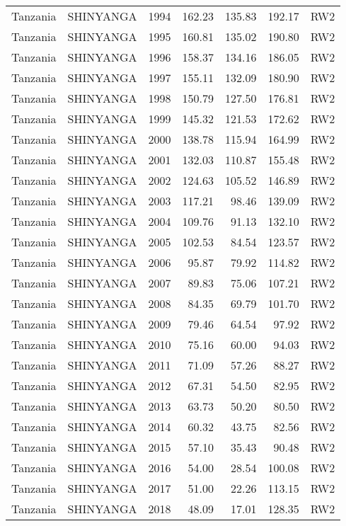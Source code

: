 \begin{longtable}{lllrrrl}
  Tanzania & SHINYANGA & 1994 & 162.23 & 135.83 & 192.17 & RW2 \\ 
  Tanzania & SHINYANGA & 1995 & 160.81 & 135.02 & 190.80 & RW2 \\ 
  Tanzania & SHINYANGA & 1996 & 158.37 & 134.16 & 186.05 & RW2 \\ 
  Tanzania & SHINYANGA & 1997 & 155.11 & 132.09 & 180.90 & RW2 \\ 
  Tanzania & SHINYANGA & 1998 & 150.79 & 127.50 & 176.81 & RW2 \\ 
  Tanzania & SHINYANGA & 1999 & 145.32 & 121.53 & 172.62 & RW2 \\ 
  Tanzania & SHINYANGA & 2000 & 138.78 & 115.94 & 164.99 & RW2 \\ 
  Tanzania & SHINYANGA & 2001 & 132.03 & 110.87 & 155.48 & RW2 \\ 
  Tanzania & SHINYANGA & 2002 & 124.63 & 105.52 & 146.89 & RW2 \\ 
  Tanzania & SHINYANGA & 2003 & 117.21 & 98.46 & 139.09 & RW2 \\ 
  Tanzania & SHINYANGA & 2004 & 109.76 & 91.13 & 132.10 & RW2 \\ 
  Tanzania & SHINYANGA & 2005 & 102.53 & 84.54 & 123.57 & RW2 \\ 
  Tanzania & SHINYANGA & 2006 & 95.87 & 79.92 & 114.82 & RW2 \\ 
  Tanzania & SHINYANGA & 2007 & 89.83 & 75.06 & 107.21 & RW2 \\ 
  Tanzania & SHINYANGA & 2008 & 84.35 & 69.79 & 101.70 & RW2 \\ 
  Tanzania & SHINYANGA & 2009 & 79.46 & 64.54 & 97.92 & RW2 \\ 
  Tanzania & SHINYANGA & 2010 & 75.16 & 60.00 & 94.03 & RW2 \\ 
  Tanzania & SHINYANGA & 2011 & 71.09 & 57.26 & 88.27 & RW2 \\ 
  Tanzania & SHINYANGA & 2012 & 67.31 & 54.50 & 82.95 & RW2 \\ 
  Tanzania & SHINYANGA & 2013 & 63.73 & 50.20 & 80.50 & RW2 \\ 
  Tanzania & SHINYANGA & 2014 & 60.32 & 43.75 & 82.56 & RW2 \\ 
  Tanzania & SHINYANGA & 2015 & 57.10 & 35.43 & 90.48 & RW2 \\ 
  Tanzania & SHINYANGA & 2016 & 54.00 & 28.54 & 100.08 & RW2 \\ 
  Tanzania & SHINYANGA & 2017 & 51.00 & 22.26 & 113.15 & RW2 \\ 
  Tanzania & SHINYANGA & 2018 & 48.09 & 17.01 & 128.35 & RW2 \\ 

\end{longtable}
